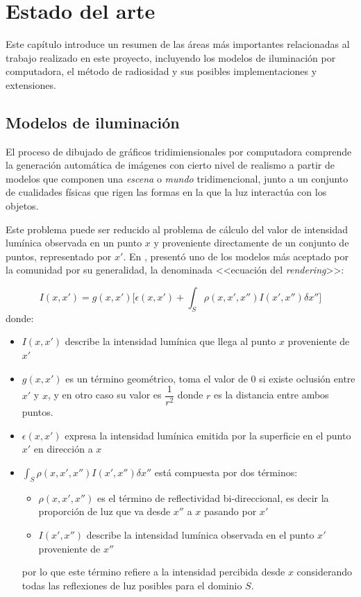 \chapter{Estado del arte}
\label{ch:chap02}

Este capítulo introduce un resumen de las áreas más importantes relacionadas al trabajo realizado en este proyecto, incluyendo los modelos de iluminación por computadora, el método de radiosidad y sus posibles implementaciones y extensiones.

\section{Modelos de iluminación}
\label{sec:dibujado}

El proceso de dibujado de gráficos tridimiensionales por computadora comprende la generación automática de imágenes con cierto nivel de realismo a partir de modelos que componen una \textit{escena} o \textit{mundo} tridimencional, junto a un conjunto de cualidades físicas que rigen las formas en la que la luz interactúa con los objetos.

Este problema puede ser reducido al problema de cálculo del valor de intensidad lumínica observada en un punto $x$ y proveniente directamente de un conjunto de puntos, representado por $x'$. En  \citeyear{Kajiya}, \citeauthor{Kajiya} presentó uno de los modelos más aceptado por la comunidad por su generalidad, la denominada <<ecuación del \textit{rendering}>>:

\begin{equation}
    I(x,x') = g(x,x') \bigg[\epsilon(x,x') + \int_{S} \rho(x,x',x'')I(x',x'') \delta x''\bigg] \label{eq:rendering}
\end{equation}
donde:
\begin{itemize}
    \item $I(x,x')$ describe la intensidad lumínica que llega al punto $x$ proveniente de $x'$
    \item $g(x,x')$ es un término geométrico, toma el valor de $0$ si existe oclusión entre $x'$ y $x$, y en otro caso su valor es $\dfrac{1}{r^{2}}$ donde $r$ es la distancia entre ambos puntos.
    \item $\epsilon(x,x')$ expresa la intensidad lumínica emitida por la superficie en el punto $x'$ en dirección a $x$
    \item $\int_{S} \rho(x,x',x'')I(x',x'') \delta x''$ está compuesta por dos términos:
        \begin{itemize}
            \item $\rho(x,x',x'')$ es el término de reflectividad bi-direccional, es decir la proporción de luz que va desde $x''$ a $x$ pasando por $x'$
            \item $I(x',x'')$ describe la intensidad lumínica observada en el punto $x'$ proveniente de $x''$
        \end{itemize}
    por lo que este término refiere a la intensidad percibida desde $x$ considerando todas las reflexiones de
    luz posibles para el dominio $S$.
\end{itemize}

